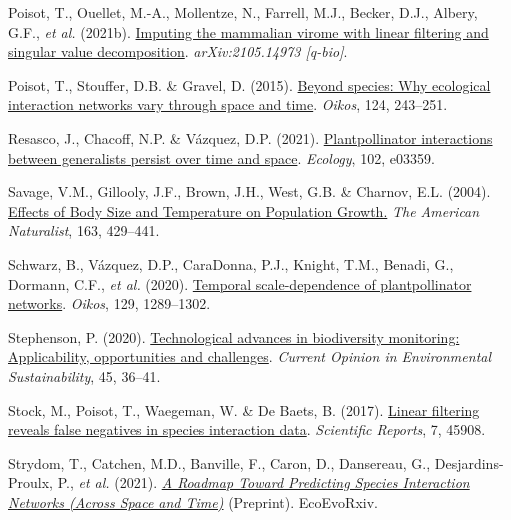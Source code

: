 \documentclass[11pt]{article}
\newlength{\cslhangindent}
\newenvironment{CSLReferences}[3] %
 {%
  \setlength{\parindent}{0pt}
  \ifodd #1 \everypar{\setlength{\hangindent}{\cslhangindent}}\ignorespaces\fi
  \ifnum #2 > 0
  \setlength{\parskip}{#2\baselineskip}
  \fi
 }%
 {}
\begin{document}
\begin{CSLReferences}{1}{0}
\leavevmode{}%
Poisot, T., Ouellet, M.-A., Mollentze, N., Farrell, M.J., Becker, D.J.,
Albery, G.F., \emph{et al.} (2021b).
\href{https://arxiv.org/abs/2105.14973}{Imputing the mammalian virome
with linear filtering and singular value decomposition}.
\emph{arXiv:2105.14973 {[}q-bio{]}}.

\leavevmode{}%
Poisot, T., Stouffer, D.B. \& Gravel, D. (2015).
\href{https://doi.org/10.1111/oik.01719}{Beyond species: Why ecological
interaction networks vary through space and time}. \emph{Oikos}, 124,
243--251.

\leavevmode{}%
Resasco, J., Chacoff, N.P. \& Vázquez, D.P. (2021).
\href{https://doi.org/10.1002/ecy.3359}{Plantpollinator interactions
between generalists persist over time and space}. \emph{Ecology}, 102,
e03359.

\leavevmode{}%
Savage, V.M., Gillooly, J.F., Brown, J.H., West, G.B. \& Charnov, E.L.
(2004). \href{https://doi.org/10.1086/381872}{Effects of Body Size and
Temperature on Population Growth.} \emph{The American Naturalist}, 163,
429--441.

\leavevmode{}%
Schwarz, B., Vázquez, D.P., CaraDonna, P.J., Knight, T.M., Benadi, G.,
Dormann, C.F., \emph{et al.} (2020).
\href{https://doi.org/10.1111/oik.07303}{Temporal scale-dependence of
plantpollinator networks}. \emph{Oikos}, 129, 1289--1302.

\leavevmode{}%
Stephenson, P. (2020).
\href{https://doi.org/10.1016/j.cosust.2020.08.005}{Technological
advances in biodiversity monitoring: Applicability, opportunities and
challenges}. \emph{Current Opinion in Environmental Sustainability}, 45,
36--41.

\leavevmode{}%
Stock, M., Poisot, T., Waegeman, W. \& De Baets, B. (2017).
\href{https://doi.org/10.1038/srep45908}{Linear filtering reveals false
negatives in species interaction data}. \emph{Scientific Reports}, 7,
45908.

\leavevmode{}%
Strydom, T., Catchen, M.D., Banville, F., Caron, D., Dansereau, G.,
Desjardins-Proulx, P., \emph{et al.} (2021).
\emph{\href{https://doi.org/10.32942/osf.io/eu7k3}{A Roadmap Toward
Predicting Species Interaction Networks (Across Space and Time)}}
(Preprint). EcoEvoRxiv.


\end{CSLReferences}
\end{document}

